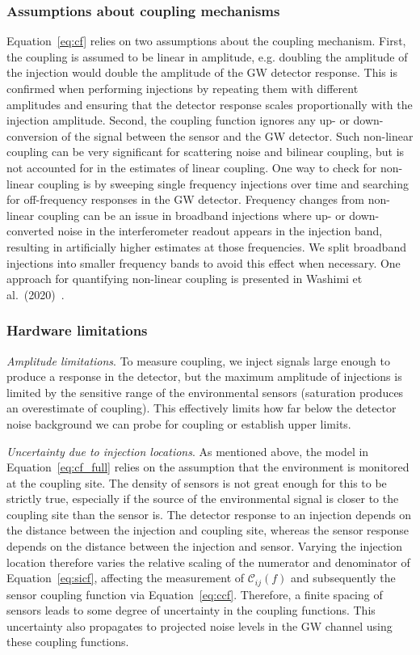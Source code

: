 \subsubsection{Assumptions about coupling mechanisms}

Equation~\ref{eq:cf} relies on two assumptions about the coupling mechanism.
First, the coupling is assumed to be linear in amplitude, e.g. doubling the amplitude of the injection would double the amplitude of the \ac{GW} detector response.
This is confirmed when performing injections by repeating them with different amplitudes and ensuring that the detector response scales proportionally with the injection amplitude.
Second, the coupling function ignores any up- or down-conversion of the signal between the sensor and the \ac{GW} detector.
Such non-linear coupling can be very significant for scattering noise and bilinear coupling, but is not accounted for in the estimates of linear coupling.
One way to check for non-linear coupling is by sweeping single frequency injections over time and searching for off-frequency responses in the \ac{GW} detector.
Frequency changes from non-linear coupling can be an issue in broadband injections where up- or down-converted noise in the interferometer readout appears in the injection band, resulting in artificially higher estimates at those frequencies.
We split broadband injections into smaller frequency bands to avoid this effect when necessary.
One approach for quantifying non-linear coupling is presented in Washimi et al.\ (2020)~\cite{Washimi_2020}.

\subsubsection{Hardware limitations}

\textit{Amplitude limitations}. To measure coupling, we inject signals large enough to produce a response in the detector, but the maximum amplitude of injections is limited by the sensitive range of the environmental sensors (saturation produces an overestimate of coupling).
This effectively limits how far below the detector noise background we can probe for coupling or establish upper limits.

\textit{Uncertainty due to injection locations}.
As mentioned above, the model in Equation~\ref{eq:cf_full} relies on the assumption that the environment is monitored at the coupling site.
The density of sensors is not great enough for this to be strictly true, especially if the source of the environmental signal is closer to the coupling site than the sensor is.
The detector response to an injection depends on the distance between the injection and coupling site, whereas the sensor response depends on the distance between the injection and sensor.
Varying the injection location therefore varies the relative scaling of the numerator and denominator of Equation~\ref{eq:sicf}, affecting the measurement of $\mathcal{C}_{ij}(f)$ and subsequently the sensor coupling function via Equation~\ref{eq:ccf}.
Therefore, a finite spacing of sensors leads to some degree of uncertainty in the coupling functions.
This uncertainty also propagates to projected noise levels in the \ac{GW} channel using these coupling functions.


